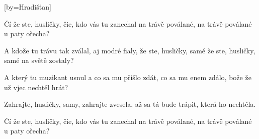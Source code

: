 [by={Hradišťan}]

\beginverse{}
\lrep{} Čí že ste, husličky, čie, kdo vás tu zanechal \rrep{}
na trávě poválané, na trávě poválané u paty ořecha?
\endverse{}

\beginverse*{}
  
\lrep{} A kdože tu trávu tak zválal, aj modré fialy, \rrep{}
že ste, husličky, samé že ste, husličky, samé na světě zostaly?
\endverse{}

\beginverse*{}
  
\endverse{}

\beginverse{}
\chordsoff{}
\lrep{} A který tu muzikant usnul a co sa mu přišlo zdát, \rrep{}
\lrep{} co sa mu enem zdálo, bože \rrep{} že už vjec nechtěl hrát?
\chordson{}
\endverse{}

\beginverse{}
\chordsoff{}
\lrep{} Zahrajte, husličky, samy, zahrajte zvesela, \rrep{}
\lrep{} až sa tá bude trápit, \rrep{} která ho nechtěla.
\chordson{}
\endverse{}

\beginverse{}
\chordsoff{}
\lrep{} Čí že ste, husličky, čie, kdo vás tu zanechal \rrep{}
na trávě poválané, na trávě poválané u paty ořecha?
\chordson{}
\endverse{}

\beginverse*{}
     
\endverse{}

\endsong{}
